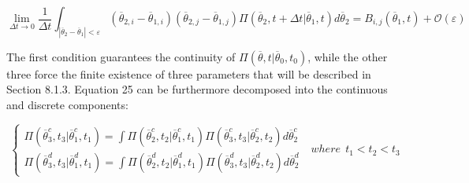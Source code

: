 \begin{equation}
\label{eq:chapKolmogAssump4}
\lim_{\Delta t \to 0} \frac{1}{\Delta t}  \int_{|
\overline{\theta}_{2}-\overline{\theta}_{1}|<\varepsilon }   
\left ( \overline{\theta}_{2,i} - \overline{\theta}_{1,i} \right ) \left ( 
\overline{\theta}_{2,j} - \overline{\theta}_{1,j} \right )
\Pi \left (\overline{\theta}_{2},t+\Delta t|\overline{\theta}_{1},t  \right ) 
d\overline{\theta}_{2} = B_{i,j}\left ( \overline{\theta}_{1},t \right ) + 
\mathcal{O}\left ( \varepsilon \right )
\end{equation}

The first condition guarantees the continuity of $\Pi \left (\overline{\theta},t|\overline{\theta}_{0},t_{0}  \right )$, while the other three force the finite existence of three parameters that will be described in Section 8.1.3. 
Equation 25 can be furthermore decomposed into the continuous and discrete components:

\begin{equation}
\label{eq:chapKolmogIntegralFormContDisct}
\left\{\begin{matrix}
\Pi \left (\overline{\theta}_{3}^{c},t_{3}|\overline{\theta}_{1}^{c},t_{1}  \right ) 
= \int \Pi \left (\overline{\theta}_{2}^{c},t_{2}|\overline{\theta}_{1}^{c},t_{1}  
\right ) \Pi \left (\overline{\theta}_{3}^{c},t_{3}|\overline{\theta}_{2}^{c},t_{2}  
\right ) d\overline{\theta}_{2}^{c}
\\ 
\Pi \left (\overline{\theta}_{3}^{d},t_{3}|\overline{\theta}_{1}^{d},t_{1}  \right ) 
= \int \Pi \left (\overline{\theta}_{2}^{d},t_{2}|\overline{\theta}_{1}^{d},t_{1}  
\right ) \Pi \left (\overline{\theta}_{3}^{d},t_{3}|\overline{\theta}_{2}^{d},t_{2}  
\right ) d\overline{\theta}_{2}^{d}
\end{matrix}\right.
\: \: \: where \:\:   t_{1}<t_{2}<t_{3}
\end{equation}

